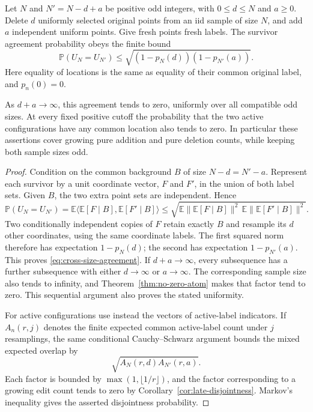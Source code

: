 \documentclass[11pt,letterpaper]{article}
\newcommand{\PP}{\mathbb P}\newcommand{\EE}{\mathbb E}
\begin{document}
\begin{corollary}
\label{cor:growing-mixed-noise}
Let $N$ and $N'=N-d+a$ be positive odd integers, with
$0\le d\le N$ and $a\ge0$. Delete $d$ uniformly selected original
points from an iid sample of size $N$, and add $a$ independent uniform
points. Give fresh points fresh labels. The survivor agreement
probability obeys the finite bound
\begin{equation}\label{eq:cross-size-agreement}
 \PP(U_N=U_{N'})
       \le\sqrt{(1-p_N(d))(1-p_{N'}(a))}.
\end{equation}
Here equality of locations is the same as equality of their common
original label, and $p_n(0)=0$.

As $d+a\to\infty$, this agreement tends to zero, uniformly over all
compatible odd sizes. At every fixed positive cutoff the probability
that the two active configurations have any common location also tends
to zero. In particular these assertions cover growing pure addition
and pure deletion counts, while keeping both sample sizes odd.
\end{corollary}
\begin{proof}
Condition on the common background $B$ of size $N-d=N'-a$.
Represent each survivor by a unit coordinate vector, $F$ and $F'$,
in the union of both label sets. Given $B$, the two extra point sets
are independent. Hence
\[
 \PP(U_N=U_{N'})
 =\EE\langle\EE[F\mid B],\EE[F'\mid B]\rangle
 \le\sqrt{\EE\|\EE[F\mid B]\|^2\,
             \EE\|\EE[F'\mid B]\|^2}.
\]
Two conditionally independent copies of $F$ retain exactly $B$ and
resample its $d$ other coordinates, using the same coordinate labels.
The first squared norm therefore has expectation $1-p_N(d)$;
the second has expectation $1-p_{N'}(a)$. This proves
\eqref{eq:cross-size-agreement}.
If $d+a\to\infty$, every subsequence has a further subsequence
with either $d\to\infty$ or $a\to\infty$.
The corresponding sample size also tends to infinity, and
Theorem~\ref{thm:no-zero-atom} makes that factor tend to zero.
This sequential argument also proves the stated uniformity.

For active configurations use instead the vectors of active-label
indicators. If $A_n(r,j)$ denotes the finite expected common active-label
count under $j$ resamplings, the same conditional Cauchy--Schwarz
argument bounds the mixed expected overlap by
\[
 \sqrt{A_N(r,d)A_{N'}(r,a)}.
\]
Each factor is bounded by $\max(1,\lfloor1/r\rfloor)$, and the
factor corresponding to a growing edit count tends to zero by
Corollary~\ref{cor:late-disjointness}. Markov's inequality gives
the asserted disjointness probability.
\end{proof}
\end{document}
